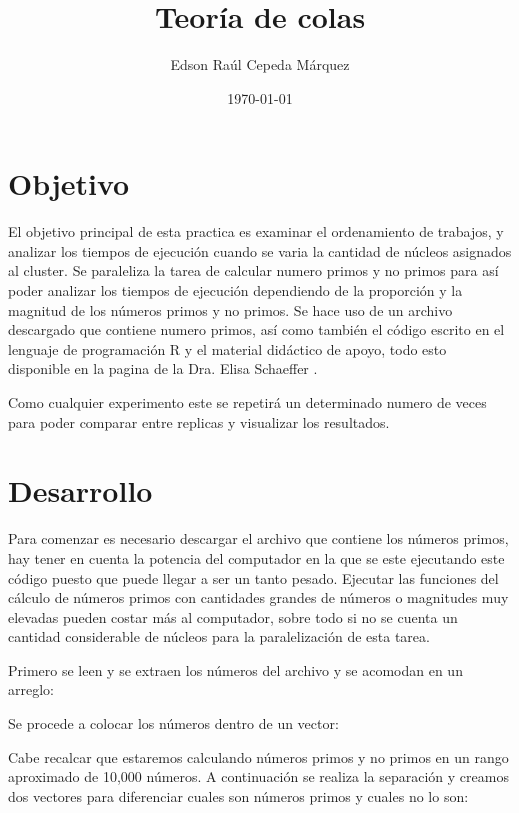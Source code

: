 \documentclass{article}
\author{Edson Raúl Cepeda Márquez}
\title{Teoría de colas}
\date{\today}
\begin{document}
\maketitle

\section{Objetivo}
El objetivo principal de esta practica es examinar el ordenamiento de trabajos, y analizar los tiempos de ejecución cuando se varia la cantidad de núcleos asignados al cluster. Se paraleliza la tarea de calcular numero primos y no primos para así poder analizar los tiempos de ejecución dependiendo de la proporción y la magnitud de los números primos y no primos.
Se hace uso de un archivo descargado que contiene numero primos, así como también el código escrito en el lenguaje de programación R \cite{r} y el material didáctico de apoyo, todo esto disponible en la pagina de la Dra. Elisa Schaeffer \cite{satu}.

Como cualquier experimento este se repetirá un determinado numero de veces para poder comparar entre replicas y visualizar los resultados.

\section{Desarrollo}
Para comenzar es necesario descargar el archivo que contiene los números primos, hay tener en cuenta la potencia del computador en la que se este ejecutando este código puesto que puede llegar a ser un tanto pesado. Ejecutar las funciones del cálculo de números primos con cantidades grandes de números o magnitudes muy elevadas pueden costar más al computador, sobre todo si no se cuenta un cantidad considerable de núcleos para la paralelización de esta tarea.

Primero se leen y se extraen los números del archivo y se acomodan en un arreglo:



Se procede a colocar los números dentro de un vector:



Cabe recalcar que estaremos calculando números primos y no primos en un rango aproximado de 10,000 números. A continuación se realiza la separación y creamos dos vectores para diferenciar cuales son números primos y cuales no lo son:
\end{document}
